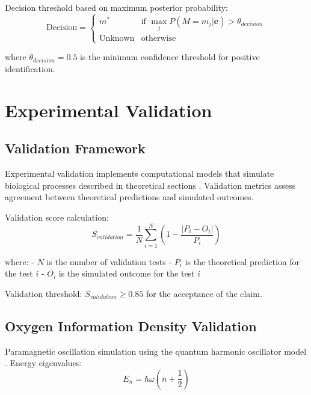 \documentclass[12pt,a4paper]{article}
\begin{document}
Decision threshold based on maximum posterior probability:
\begin{equation}
\text{Decision} = \begin{cases}
m^* & \text{if } \max_j P(M = m_j | \mathbf{e}) > \theta_{decision} \\
\text{Unknown} & \text{otherwise}
\end{cases}
\end{equation}

where $\theta_{decision} = 0.5$ is the minimum confidence threshold for positive identification.


\section{Experimental Validation}

\subsection{Validation Framework}

Experimental validation implements computational models that simulate biological processes described in theoretical sections \cite{saltelli2008global}. Validation metrics assess agreement between theoretical predictions and simulated outcomes.

Validation score calculation:
\begin{equation}
S_{validation} = \frac{1}{N} \sum_{i=1}^N \left(1 - \frac{|P_i - O_i|}{P_i}\right)
\end{equation}

where:
- $N$ is the number of validation tests
- $P_i$ is the theoretical prediction for the test $i$
- $O_i$ is the simulated outcome for the test $i$

Validation threshold: $S_{validation} \geq 0.85$ for the acceptance of the claim.

\subsection{Oxygen Information Density Validation}

Paramagnetic oscillation simulation using the quantum harmonic oscillator model \cite{griffiths2004introduction}. Energy eigenvalues:
\begin{equation}
E_n = \hbar \omega \left(n + \frac{1}{2}\right)
\end{equation}
\end{document}
